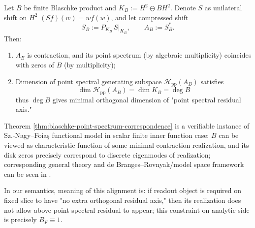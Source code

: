 \begin{theorem}\label{thm:blaschke-point-spectrum-correspondence}
Let \(B\) be finite Blaschke product and \(K_B:=H^2\ominus BH^2\).
Denote \(S\) as unilateral shift on \(H^2\) \((Sf)(w)=wf(w)\), and let compressed shift
\[
S_B:=P_{K_B}\,S|_{K_B},
\qquad
A_B:=S_B^\ast.
\]
Then:
\begin{enumerate}
  \item \(A_B\) is contraction, and its point spectrum (by algebraic multiplicity) coincides with zeros of \(B\) (by multiplicity);
  \item Dimension of point spectral generating subspace \(\mathcal{H}_{\mathrm{pp}}(A_B)\) satisfies
  \[
  \boxed{\;\dim\mathcal{H}_{\mathrm{pp}}(A_B)=\dim K_B=\deg B\;}
  \]
  thus \(\deg B\) gives minimal orthogonal dimension of "point spectral residual axis."
\end{enumerate}
\end{theorem}

\begin{remark}\label{rem:blaschke-characteristic-function-alignment}
Theorem \ref{thm:blaschke-point-spectrum-correspondence} is a verifiable instance of Sz.-Nagy–Foia\c{s} functional model in scalar finite inner function case: \(B\) can be viewed as characteristic function of some minimal contraction realization, and its disk zeros precisely correspond to discrete eigenmodes of realization; corresponding general theory and de Branges–Rovnyak/model space framework can be seen in \cite{SzNagyFoiasBercoviciKerchy2010HarmonicAnalysis,Sarason1994SubHardyHilbertSpaces}.
\par
In our semantics, meaning of this alignment is: if readout object is required on fixed slice to have "no extra orthogonal residual axis," then its realization does not allow above point spectral residual to appear; this constraint on analytic side is precisely \(B_F\equiv 1\).
\end{remark}

